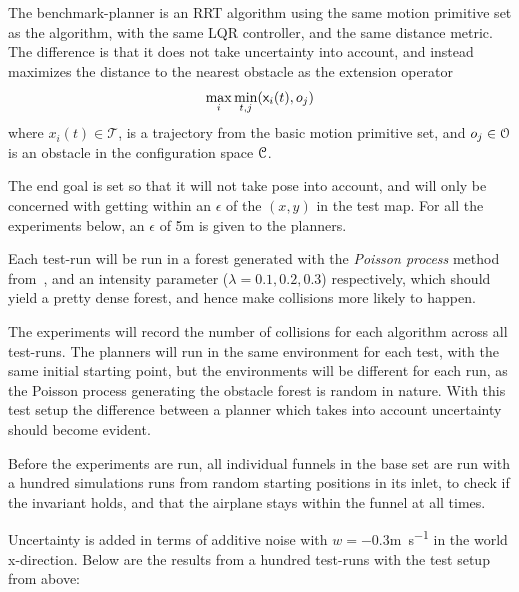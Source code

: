 The benchmark-planner is an \ac{RRT} algorithm using the same motion primitive
set as the \rrtfunnel{} algorithm, with the same \ac{LQR} controller, and the
same distance metric. The difference is that it does not take uncertainty into
account, and instead maximizes the distance to the nearest obstacle as the
extension operator \ie{}
\begin{equation}
  \max_{i}\min_{t,j}({\mathbf{\mathsf{x}}}_{i}(t), o_{j})
\end{equation}
where \(x_{i}(t) \in \mathcal{T}\), is a trajectory from the basic motion
primitive set, and \(o_{j} \in \mathcal{O}{}\) is an obstacle in the
configuration space \(\mathcal{C}{}\).

The end goal is set so that it will not take pose into account, and will only be
concerned with getting within an \(\epsilon\) of the \((x,y)\) in the test map.
For all the experiments below, an \(\epsilon\) of 5\si{\metre} is given to the
planners.

Each test-run will be run in a forest generated with the \textit{Poisson
  process} method from~, and an intensity parameter
(\(\lambda = 0.1,0.2,0.3\)) respectively, which should yield a pretty dense
forest, and hence make collisions more likely to happen.

The experiments will record the number of collisions for each algorithm across
all test-runs. The planners will run in the same environment for each test, with
the same initial starting point, but the environments will be different for each
run, as the Poisson process generating the obstacle forest is random in nature.
With this test setup the difference between a planner which takes into account
uncertainty should become evident.

Before the experiments are run, all individual funnels in the base set are run
with a hundred simulations runs from random starting positions in its inlet, to
check if the invariant holds, and that the airplane stays within the funnel at
all times. 

Uncertainty is added in terms of additive noise with \(w = -0.3\)\si{m.s^{-1}}
in the world x-direction. Below are the results from a hundred test-runs with
the test setup from above:

